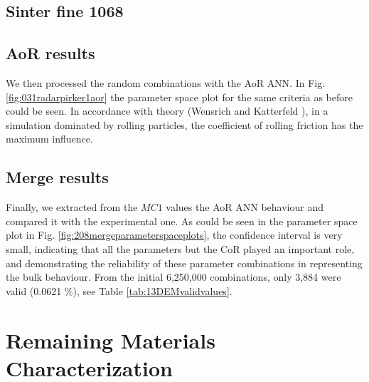 
\subsection{Sinter fine 1068}
\label{subsec:sinterfine1068}





\subsection{AoR results}
\label{subsec:aorresults}

We then processed the random combinations with the \acs{AoR} \acs{ANN}. In Fig.
\ref{fig:031radarpirker1aor} the parameter space plot for the same criteria as
before could be seen.
In accordance with theory (Wensrich and Katterfeld \cite{RefWorks:87}), in a simulation dominated
by rolling particles, the coefficient of rolling friction has the maximum
influence. \\

% 

\subsection{Merge results}
\label{subsec:mergeresults}

Finally, we extracted from the $MC1$ values the \acs{AoR} \acs{ANN} behaviour
and compared it with the experimental one.
As could be seen in the parameter space plot in Fig.
\ref{fig:208mergeparameterspaceplots}, the confidence interval is very small,
indicating that all the parameters but the \acs{CoR} played an important role, 
and demonstrating the reliability of these parameter
combinations in representing the bulk behaviour.
From the initial 6,250,000 combinations, only 3,884 were valid (0.0621
\%), see Table \ref{tab:13DEMvalidvalues}.






\section{Remaining Materials Characterization}
\label{sec:remainingmaterialscharacterization}

